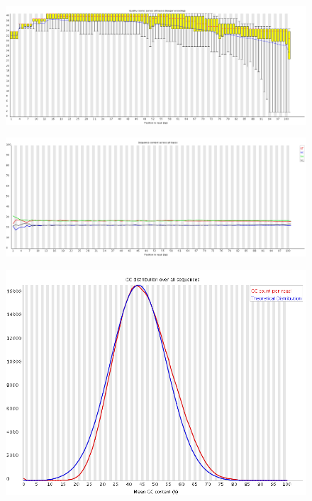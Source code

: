 \documentclass{article}
\begin{document}
    \begin{figure}[htbp]
      \centering
      \includegraphics[width=1.0\linewidth] {fastqc/3_120719_BD158KACXX_1_nophix-sort-dup_fastqc/Images/per_base_quality.png}
      \caption{}
    \end{figure}
    \begin{figure}[htbp]
      \centering
      \includegraphics[width=0.85\linewidth] {fastqc/3_120719_BD158KACXX_1_nophix-sort-dup_fastqc/Images/per_base_sequence_content.png}
      \caption{}
    \end{figure}
    \begin{figure}[htbp]
      \centering
      \includegraphics[width=0.85\linewidth] {fastqc/3_120719_BD158KACXX_1_nophix-sort-dup_fastqc/Images/per_sequence_gc_content.png}
      \caption{}
    \end{figure}
\end{document}
